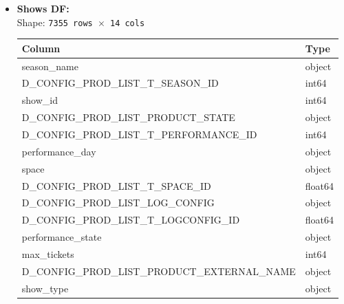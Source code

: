 \documentclass[a4paper,12pt]{report}  %
\begin{document}
\begin{itemize}
  \item \textbf{Shows DF:}\\[-0.5ex]
        Shape: \texttt{7355 rows $\times$ 14 cols}\\[1ex]
        \begin{tabular}{@{}ll@{}}
          \toprule
          \textbf{Column}                             & \textbf{Type}     \\
          \midrule
          season\_name                                & object            \\
          D\_CONFIG\_PROD\_LIST\_T\_SEASON\_ID        & int64             \\
          show\_id                                   & int64             \\
          D\_CONFIG\_PROD\_LIST\_PRODUCT\_STATE       & object            \\
          D\_CONFIG\_PROD\_LIST\_T\_PERFORMANCE\_ID   & int64             \\
          performance\_day                           & object            \\
          space                                       & object            \\
          D\_CONFIG\_PROD\_LIST\_T\_SPACE\_ID         & float64           \\
          D\_CONFIG\_PROD\_LIST\_LOG\_CONFIG          & object            \\
          D\_CONFIG\_PROD\_LIST\_T\_LOGCONFIG\_ID     & float64           \\
          performance\_state                         & object            \\
          max\_tickets                               & int64             \\
          D\_CONFIG\_PROD\_LIST\_PRODUCT\_EXTERNAL\_NAME & object          \\
          show\_type                                  & object            \\
          \bottomrule
        \end{tabular}


\end{itemize}
\end{document}

